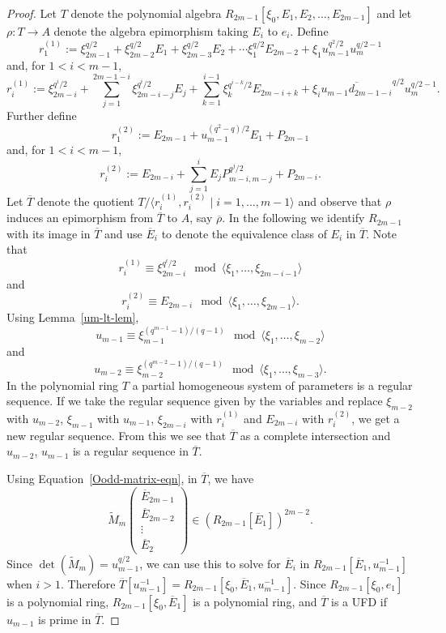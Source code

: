 \documentclass[10pt,a4paper]{amsart}
\begin{document}
\begin{proof} Let $T$ denote the polynomial algebra $R_{2m-1}[\xi_0,E_1,E_2,\ldots,E_{2m-1}]$ and let $\rho:T\to A$ denote the algebra epimorphism taking $E_i$ to $e_i$.  Define 
    $$
        r_1^{(1)}:=\xi_{2m-1}^{q/2}+\xi_{2m-2}^{q/2}E_1+\xi_{2m-3}^{q/2}E_2+\cdots \xi_{1}^{q/2}E_{2m-2}
        +\xi_1u_{m-1}^{q^2/2}u_m^{q/2-1}
    $$
and, for $1<i<m-1$,
    $$
        r_i^{(1)}:=\xi_{2m-i}^{q^i/2}+\sum_{j=1}^{2m-1-i} \xi_{2m-i-j}^{q^i/2} E_j +\sum_{k=1}^{i-1} \xi_k^{q^{i-k}/2} E_{2m-i+k}
        +\xi_i \overline{u_{m-1}d_{2m-1-i}}^{q/2} u_m^{q/2-1}.
    $$
Further define
    $$
        r_1^{(2)}:=E_{2m-1}+u_{m-1}^{(q^2-q)/2}E_1+P_{2m-1} 
    $$
and, for $1<i<m-1$,
    $$
        r_i^{(2)}:=E_{2m-i}+\sum_{j=1}^i E_jP_{m-i,m-j}^{q^j/2}+P_{2m-i}.
    $$
Let $\overline{T}$ denote the quotient $T/\langle r_i^{(1)},r_i^{(2)}\mid i=1,\dots,m-1\rangle$
and observe that $\rho$ induces an epimorphism  from $\overline{T}$ to $A$, say $\overline{\rho}$.
In the following we identify $R_{2m-1}$ with its image in $\overline{T}$ and use $\overline{E}_i$
to denote the equivalence class of $E_i$ in $\overline{T}$.
Note that $$r_i^{(1)}\equiv \xi_{2m-i}^{q^i/2}\mod \langle\xi_1,\ldots,\xi_{2m-i-1}\rangle$$
and $$r_i^{(2)}\equiv E_{2m-i}\mod \langle\xi_1,\ldots,\xi_{2m-1}\rangle.$$
Using Lemma~\ref{um-lt-lem}, 
$$u_{m-1}\equiv \xi_{m-1}^{(q^{m-1}-1)/(q-1)} \mod  \langle\xi_1,\ldots,\xi_{m-2}\rangle$$
and
$$u_{m-2}\equiv \xi_{m-2}^{(q^{m-2}-1)/(q-1)} \mod  \langle\xi_1,\ldots,\xi_{m-3}\rangle.$$
In the polynomial ring $T$ a partial homogeneous system of parameters is a regular sequence.
If we take the regular sequence given by the variables and replace $\xi_{m-2}$ with $u_{m-2}$,
$\xi_{m-1}$ with $u_{m-1}$, $\xi_{2m-i}$ with $r_i^{(1)}$ and $E_{2m-i}$ with $r_i^{(2)}$, we get a new regular sequence.
From this we see that $\overline{T}$ as a complete intersection and $u_{m-2}$, $u_{m-1}$ is a regular sequence in $\overline{T}$.

Using Equation~\ref{Oodd-matrix-eqn}, in $\overline{T}$, we have
$$\widetilde{M}_m \begin{pmatrix} \overline{E}_{2m-1}\\ \overline{E}_{2m-2} \\ \vdots\\ \overline{E}_2 \end{pmatrix} \in \left(R_{2m-1}[\overline{E}_1]\right)^{2m-2}.$$
Since $\det(\widetilde{M}_m)=u_{m-1}^{q/2}$, we can use this to solve for $\overline{E}_i$ in $R_{2m-1}[\overline{E}_1,u_{m-1}^{-1}]$ when $i>1$.
Therefore $\overline{T}[u_{m-1}^{-1}]=R_{2m-1}[\xi_0,\overline{E}_1, u_{m-1}^{-1}]$.
Since $R_{2m-1}[\xi_0,e_1]$ is a polynomial ring, $R_{2m-1}[\xi_0,\overline{E}_1]$ is a polynomial ring, and $\overline{T}$ is a UFD if $u_{m-1}$ is prime in $\overline{T}$.


\end{proof}
\end{document}
